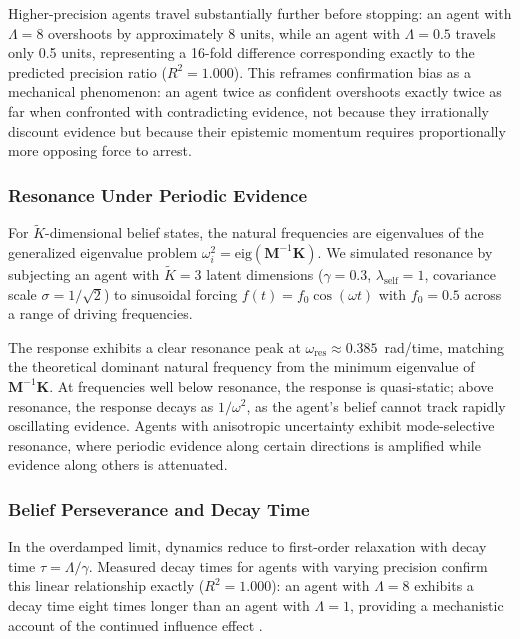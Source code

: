 \documentclass[12pt]{article}
\begin{document}
Higher-precision agents travel substantially further before stopping: an agent with $\Lambda = 8$ overshoots by approximately 8 units, while an agent with $\Lambda = 0.5$ travels only 0.5 units, representing a 16-fold difference corresponding exactly to the predicted precision ratio ($R^2 = 1.000$). This reframes confirmation bias as a mechanical phenomenon: an agent twice as confident overshoots exactly twice as far when confronted with contradicting evidence, not because they irrationally discount evidence but because their epistemic momentum requires proportionally more opposing force to arrest.

\subsubsection{Resonance Under Periodic Evidence}

For $\tilde{K}$-dimensional belief states, the natural frequencies are eigenvalues of the generalized eigenvalue problem $\omega_i^2 = \text{eig}(\mathbf{M}^{-1}\mathbf{K})$. We simulated resonance by subjecting an agent with $\tilde{K}=3$ latent dimensions ($\gamma = 0.3$, $\lambda_{\text{self}} = 1$, covariance scale $\sigma = 1/\sqrt{2}$) to sinusoidal forcing $f(t) = f_0 \cos(\omega t)$ with $f_0 = 0.5$ across a range of driving frequencies.

The response exhibits a clear resonance peak at $\omega_{\text{res}} \approx 0.385$~rad/time, matching the theoretical dominant natural frequency from the minimum eigenvalue of $\mathbf{M}^{-1}\mathbf{K}$. At frequencies well below resonance, the response is quasi-static; above resonance, the response decays as $1/\omega^2$, as the agent's belief cannot track rapidly oscillating evidence. Agents with anisotropic uncertainty exhibit mode-selective resonance, where periodic evidence along certain directions is amplified while evidence along others is attenuated.

\subsubsection{Belief Perseverance and Decay Time}

In the overdamped limit, dynamics reduce to first-order relaxation with decay time $\tau = \Lambda/\gamma$. Measured decay times for agents with varying precision confirm this linear relationship exactly ($R^2 = 1.000$): an agent with $\Lambda = 8$ exhibits a decay time eight times longer than an agent with $\Lambda = 1$, providing a mechanistic account of the continued influence effect \citep{Lewandowsky2012}.
\end{document}
